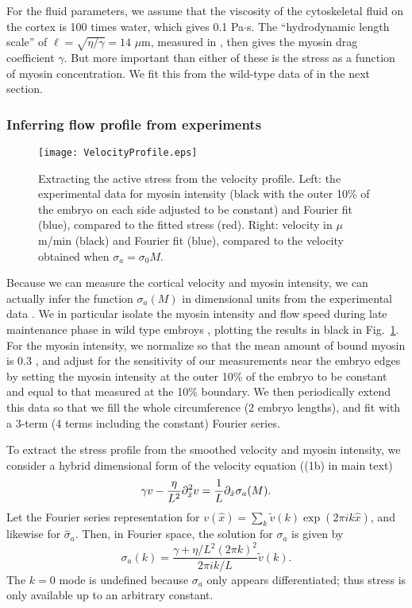\documentclass[11pt]{article}
\newcommand{\6}[1]{#1_{\text{6}}}
\newcommand{\3}[1]{#1_{\text{3}}}
\begin{document}
For the fluid parameters, we assume that the viscosity of the cytoskeletal fluid on the cortex is 100 times water, which gives 0.1 Pa$\cdot$s. The ``hydrodynamic length scale'' of $\ell=\sqrt{\eta/\gamma}=14$ $\mu$m, measured in \cite{mayer2010anisotropies, saha2016determining}, then gives the myosin drag coefficient $\gamma$. But more important than either of these is the stress as a function of myosin concentration. We fit this from the wild-type data of \cite{sailer2015dynamic} in the next section.

\subsubsection{Inferring flow profile from experiments \label{sec:MyVelFit}}

\begin{figure}
\centering
\texttt{[image: VelocityProfile.eps]}
\caption{\label{fig:VelProf} Extracting the active stress from the velocity profile. Left: the experimental data for myosin intensity (black with the outer 10\% of the embryo on each side adjusted to be constant) and Fourier fit (blue), compared to the fitted stress (red). Right: velocity in $\mu$m/min (black) and Fourier fit (blue), compared to the velocity obtained when $\sigma_a=\sigma_0 M$. }
\end{figure}


Because we can measure the cortical velocity and myosin intensity, we can actually infer the function $\sigma_a(M)$ in dimensional units from the experimental data \cite{sailer2015dynamic}. We in particular isolate the myosin intensity and flow speed during late maintenance phase in wild type embroys \cite[Fig.~1B(bottom)]{sailer2015dynamic}, plotting the results in black in Fig.\ \ref{fig:VelProf}. For the myosin intensity, we normalize so that the mean amount of bound myosin is 0.3 \cite[Fig.~S3]{gross2019guiding}, and adjust for the sensitivity of our measurements near the embryo edges by setting the myosin intensity at the outer 10\% of the embryo to be constant and equal to that measured at the 10\% boundary. We then periodically extend this data so that we fill the whole circumference (2 embryo lengths), and fit with a 3-term (4 terms including the constant) Fourier series. 

To extract the stress profile from the smoothed velocity and myosin intensity, we consider a hybrid dimensional form of the velocity equation ((1b) in main text)
\begin{equation*}
\gamma v -\frac{ \eta}{L^2} \partial_{\hat{x}}^2 v = \frac{1}{L} \partial_{\hat{x}}  \sigma_a(M). 
\end{equation*}
Let the Fourier series representation for $v(\hat x)= \sum_k \tilde v(k) \exp{\left(2 \pi i k \hat x \right)}$, and likewise for $\hat \sigma_a$. Then, in Fourier space, the solution for $\sigma_a$ is given by 
\begin{equation}
\label{eq:SigmaAF}
\sigma_a(k) = \frac{\gamma+ \eta/L^2 \left(2 \pi k\right)^2}{2 \pi i k/L} \tilde v(k). 
\end{equation}
The $k=0$ mode is undefined because $\sigma_a$ only appears differentiated; thus stress is only available up to an arbitrary constant.
\end{document}
